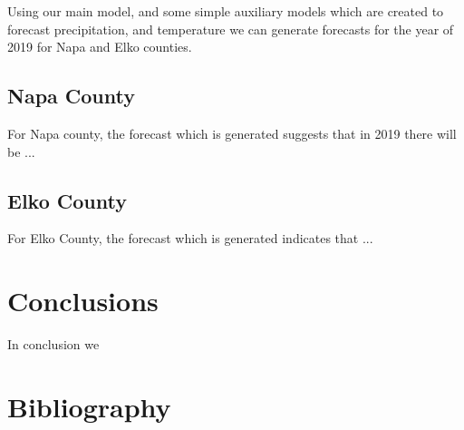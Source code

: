 \documentclass[12pt]{article}
\begin{document}
Using our main model, and some simple auxiliary models which are created to forecast precipitation, and temperature we can generate forecasts for the year of 2019 for Napa and Elko counties. 

\subsection{\textrm{Napa County}}

For Napa county, the forecast which is generated suggests that in 2019 there will be ...


\subsection{\textrm{Elko County}} 

For Elko County, the forecast which is generated indicates that ...


\section{\textrm{Conclusions}}

In conclusion we 

\pagebreak

\section*{\textrm{Bibliography}}
\end{document}
